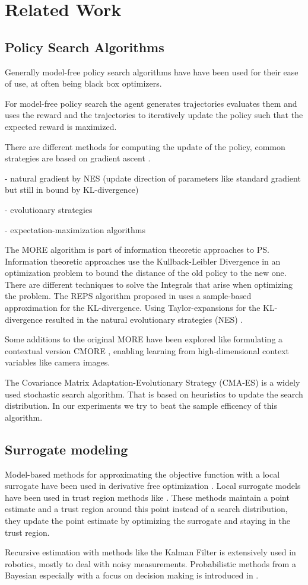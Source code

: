 
\chapter{Related Work}

\section{Policy Search Algorithms}
Generally model-free policy search algorithms have have been used
for their ease of use, at often being black box optimizers.

For model-free policy search the agent generates trajectories
evaluates them and uses the reward and the trajectories to
iteratively update the policy such that the expected reward is maximized.

There are different methods for computing the update of the
policy, common strategies are based on gradient ascent
\citet{peters2006policy}.

- natural gradient by NES (update direction of parameters like standard
gradient but still in bound by KL-divergence)

- evolutionary strategies

- expectation-maximization algorithms

The MORE algorithm is part of information theoretic approaches
to PS.
Information theoretic approaches use
the Kullback-Leibler Divergence in an optimization problem
to bound the distance of the old policy to the new one.
There are different techniques to solve the Integrals that arise
when optimizing the problem.
The REPS algorithm proposed in \cite{peters2010relative} uses a
sample-based approximation for the KL-divergence.
Using Taylor-expansions for the KL-divergence resulted in the natural
evolutionary strategies (NES) \cite{wierstra2014natural}.

Some additions to the original MORE have been explored like formulating
a contextual version CMORE \citet{tangkaratt2017policy}, enabling learning from high-dimensional
context variables like camera images.

The Covariance Matrix Adaptation-Evolutionary Strategy (CMA-ES)
is a widely used stochastic search algorithm. That is based on
heuristics to update the search distribution. In our experiments
we try to beat the sample efficency of this algorithm.


\section{Surrogate modeling}
Model-based methods for approximating the objective function
with a local surrogate have been used in
derivative free optimization \citet{nocedal2006numerical}.
Local surrogate models have been used in trust region methods like \citet{powell2009bobyqa}. These methods maintain a point estimate
and a trust region around this point instead
of a search distribution, they update the point estimate by optimizing
the surrogate and staying in the trust region.

Recursive estimation with methods like
the Kalman Filter is extensively used in robotics, mostly to deal with
noisy measurements. Probabilistic methods from
a Bayesian especially with a focus on decision making
is introduced in \citet{thrun2002probabilistic}.

